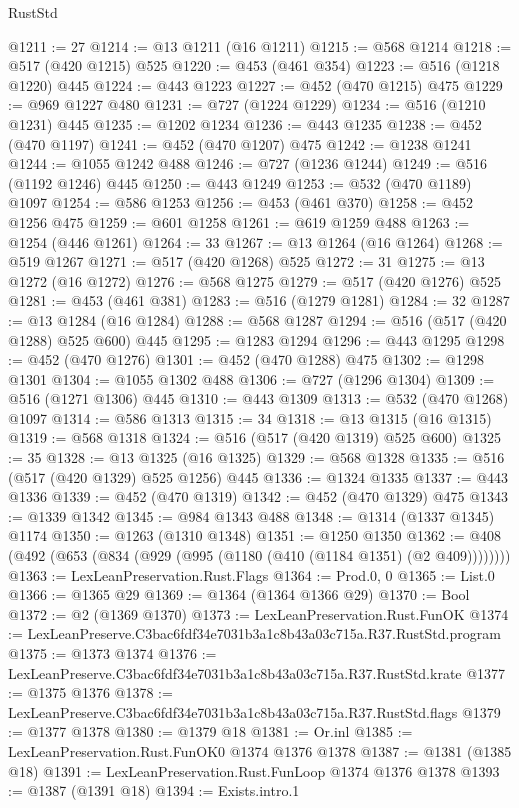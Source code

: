 \begin{lexlean}{RustStd}
\begin{coremodule}
@1211 := 27
@1214 := @13 @1211 (@16 @1211)
@1215 := @568 @1214
@1218 := @517 (@420 @1215) @525
@1220 := @453 (@461 @354)
@1223 := @516 (@1218 @1220) @445
@1224 := @443 @1223
@1227 := @452 (@470 @1215) @475
@1229 := @969 @1227 @480
@1231 := @727 (@1224 @1229)
@1234 := @516 (@1210 @1231) @445
@1235 := @1202 @1234
@1236 := @443 @1235
@1238 := @452 (@470 @1197)
@1241 := @452 (@470 @1207) @475
@1242 := @1238 @1241
@1244 := @1055 @1242 @488
@1246 := @727 (@1236 @1244)
@1249 := @516 (@1192 @1246) @445
@1250 := @443 @1249
@1253 := @532 (@470 @1189) @1097
@1254 := @586 @1253
@1256 := @453 (@461 @370)
@1258 := @452 @1256 @475
@1259 := @601 @1258
@1261 := @619 @1259 @488
@1263 := @1254 (@446 @1261)
@1264 := 33
@1267 := @13 @1264 (@16 @1264)
@1268 := @519 @1267
@1271 := @517 (@420 @1268) @525
@1272 := 31
@1275 := @13 @1272 (@16 @1272)
@1276 := @568 @1275
@1279 := @517 (@420 @1276) @525
@1281 := @453 (@461 @381)
@1283 := @516 (@1279 @1281)
@1284 := 32
@1287 := @13 @1284 (@16 @1284)
@1288 := @568 @1287
@1294 := @516 (@517 (@420 @1288) @525 @600) @445
@1295 := @1283 @1294
@1296 := @443 @1295
@1298 := @452 (@470 @1276)
@1301 := @452 (@470 @1288) @475
@1302 := @1298 @1301
@1304 := @1055 @1302 @488
@1306 := @727 (@1296 @1304)
@1309 := @516 (@1271 @1306) @445
@1310 := @443 @1309
@1313 := @532 (@470 @1268) @1097
@1314 := @586 @1313
@1315 := 34
@1318 := @13 @1315 (@16 @1315)
@1319 := @568 @1318
@1324 := @516 (@517 (@420 @1319) @525 @600)
@1325 := 35
@1328 := @13 @1325 (@16 @1325)
@1329 := @568 @1328
@1335 := @516 (@517 (@420 @1329) @525 @1256) @445
@1336 := @1324 @1335
@1337 := @443 @1336
@1339 := @452 (@470 @1319)
@1342 := @452 (@470 @1329) @475
@1343 := @1339 @1342
@1345 := @984 @1343 @488
@1348 := @1314 (@1337 @1345) @1174
@1350 := @1263 (@1310 @1348)
@1351 := @1250 @1350
@1362 := @408 (@492 (@653 (@834 (@929 (@995 (@1180 (@410 (@1184 @1351) (@2 @409))))))))
@1363 := LexLeanPreservation.Rust.Flags
@1364 := Prod.{0, 0}
@1365 := List.{0}
@1366 := @1365 @29
@1369 := @1364 (@1364 @1366 @29)
@1370 := Bool
@1372 := @2 (@1369 @1370)
@1373 := LexLeanPreservation.Rust.FunOK
@1374 := LexLeanPreserve.C3bac6fdf34e7031b3a1c8b43a03c715a.R37.RustStd.program
@1375 := @1373 @1374
@1376 := LexLeanPreserve.C3bac6fdf34e7031b3a1c8b43a03c715a.R37.RustStd.krate
@1377 := @1375 @1376
@1378 := LexLeanPreserve.C3bac6fdf34e7031b3a1c8b43a03c715a.R37.RustStd.flags
@1379 := @1377 @1378
@1380 := @1379 @18
@1381 := Or.inl
@1385 := LexLeanPreservation.Rust.FunOK0 @1374 @1376 @1378
@1387 := @1381 (@1385 @18)
@1391 := LexLeanPreservation.Rust.FunLoop @1374 @1376 @1378
@1393 := @1387 (@1391 @18)
@1394 := Exists.intro.{1}

\end{coremodule}
\end{lexlean}
